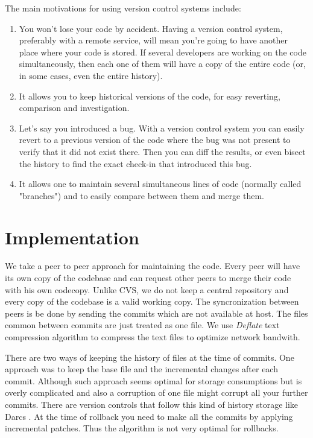 \documentclass[12pt]{article}
\begin{document}
The main motivations for using version control systems include:

\begin{enumerate}
\item You won't lose your code by accident. Having a version control system,
  preferably with a remote service, will mean you're going to have another
  place where your code is stored. If several developers are working on the
  code simultaneously, then each one of them will have a copy of the entire
  code (or, in some cases, even the entire history).

\item It allows you to keep historical versions of the code, for easy
  reverting, comparison and investigation.

\item Let's say you introduced a bug. With a version control system you can
  easily revert to a previous version of the code where the bug was not
  present to verify that it did not exist there. Then you can diff the
  results, or even bisect the history to find the exact check-in that
  introduced this bug.

\item It allows one to maintain several simultaneous lines of code (normally
  called "branches") and to easily compare between them and merge them.

\end{enumerate}



\section{Implementation}
We take a peer to peer approach for maintaining the code. Every peer will have
its own copy of the codebase and can request other peers to merge their code
with his own codecopy. Unlike CVS, we do not keep a central repository and
every copy of the codebase is a valid working copy. The syncronization between
peers is be done by sending the commits which are not available at host. The
files common between commits are just treated as one file. We use
\emph{Deflate} text compression algorithm to compress the text files to
optimize network bandwith.

There are two ways of keeping the history of files at the time of
commits. One approach was to keep the base file and the incremental changes
after each commit. Although such approach seems optimal for storage
consumptions but is overly complicated and also a corruption of one file might
corrupt all your further commits. There are version controls that follow this
kind of history storage like Darcs \cite{darcs}. At the time of rollback you
need to make all the commits by applying incremental patches. Thus the
algorithm is not very optimal for rollbacks.
\end{document}
